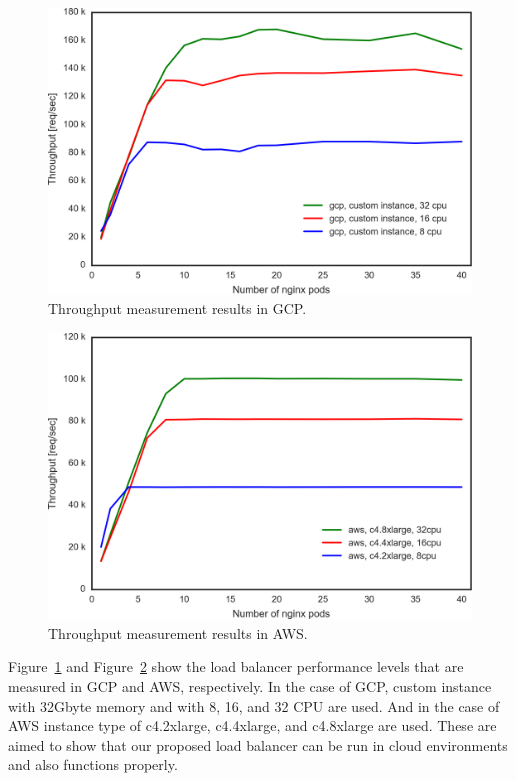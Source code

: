 \begin{figure}[h]
    \includegraphics[width=0.9\columnwidth]{Figs/gcp_all_ieice}
    \caption[Throughput measurement results in GCP]{Throughput measurement results in GCP.}
    \label{fig:gcp_all_ieice}
\end{figure}


\begin{figure}[h]
    \includegraphics[width=0.9\columnwidth]{Figs/aws_c4_ieice}
    \caption[Throughput measurement results in AWS]{Throughput measurement results in AWS.}
    \label{fig:aws_c4_ieice}
\end{figure}

Figure~\ref{fig:gcp_all_ieice} and Figure~\ref{fig:aws_c4_ieice} show the load balancer performance levels that are measured in GCP and AWS, respectively. In the case of GCP, custom instance with 32Gbyte memory and with 8, 16, and 32 CPU are used.
And in the case of AWS instance type of c4.2xlarge, c4.4xlarge, and c4.8xlarge are used.
These are aimed to show that our proposed load balancer can be run in cloud environments and also functions properly.

